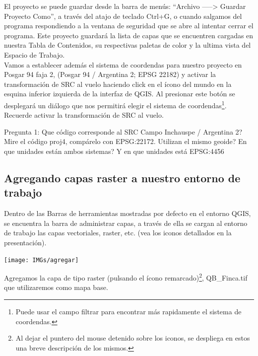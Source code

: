 \documentclass[onecolumn]{article}
\begin{document}
El proyecto se puede guardar desde la barra de menús: “Archivo -----> Guardar Proyecto Como”, a través del atajo de teclado Ctrl+G, o cuando salgamos del programa respondiendo a la ventana de seguridad que se abre al intentar cerrar el programa. 
Este proyecto guardará la lista de capas que se encuentren cargadas en nuestra Tabla de Contenidos, su respectivas paletas de color y la ultima vista del Espacio de Trabajo.\\

Vamos a establecer además el sistema de coordendas para nuestro proyecto en Posgar 94 faja 2, (Posgar 94 / Argentina 2; EPSG 22182) y activar la transformación de SRC al vuelo haciendo click en el ícono del mundo en la esquina inferior izquierda de la interfaz de QGIS. 
Al presionar este botón se desplegará un diálogo que nos permitirá elegir el sistema de coordendas\footnote{Puede usar el campo filtrar para encontrar más rapidamente el sistema de coordendas.}. Recuerde activar la transformación de SRC al vuelo.\\



\begin{mdframed}[]
	Pregunta 1: Que código corresponde al SRC Campo Inchauspe / Argentina 2? Mire el código proj4, compárelo con EPSG:22172. Utilizan el mismo geoide? En que unidades están ambos sistemas? Y en que unidades está EPSG:4456
\end{mdframed}



\subsection{Agregando capas raster a nuestro entorno de trabajo}

Dentro de las Barras de herramientas mostradas por defecto en el entorno QGIS, se encuentra la barra de administrar capas, a través de ella se cargan al entorno de trabajo las capas vectoriales, raster, etc. (vea los iconos detallados en la presentación).


\begin{center}
	\texttt{[image: IMGs/agregar]}
\end{center}

Agregamos la capa de tipo raster (pulsando el ícono remarcado)\footnote{Al dejar el puntero del mouse detenido sobre los iconos, se despliega en estos una breve descripción de los mismos.}, QB\_Finca.tif que utilizaremos como mapa base.\\
\end{document}
